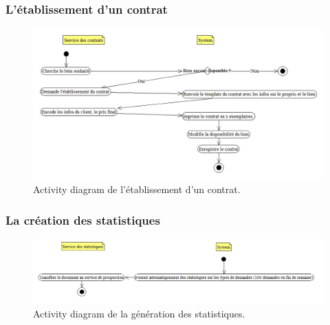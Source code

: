 \subsubsection{L'établissement d'un contrat}
\begin{figure}[H]
\centering
\includegraphics[width=16cm]{contrat.png}
\caption{Activity diagram de l'établissement d'un contrat.}
\label{fig:contrat}
\end{figure}

\subsubsection{La création des statistiques}
\begin{figure}[H]
\centering
\includegraphics[width=16cm]{stats.png}
\caption{Activity diagram de la génération des statistiques.}
\label{fig:stats}
\end{figure}